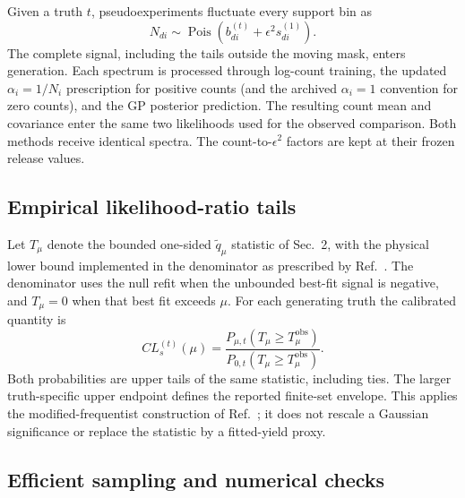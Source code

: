 \documentclass[11pt]{article}
\begin{document}
Given a truth $t$, pseudoexperiments fluctuate every support bin as
\begin{equation}
 N_{di}\sim\operatorname{Pois}\!\left(b^{(t)}_{di}
       +\epsilon^2 s^{(1)}_{di}\right).
\end{equation}
The complete signal, including the tails outside the moving mask, enters
generation. Each spectrum is processed through log-count training, the
updated $\alpha_i=1/N_i$ prescription for positive counts (and the archived
$\alpha_i=1$ convention for zero counts), and the GP posterior prediction.
The resulting count mean and covariance enter the same two likelihoods
used for the observed comparison. Both methods receive identical spectra.
The count-to-$\epsilon^2$ factors are kept at their frozen release values.

\subsection{Empirical likelihood-ratio tails}

Let $T_\mu$ denote the bounded one-sided $\widetilde q_\mu$ statistic of
Sec.~2, with the physical lower bound implemented in the denominator as prescribed
by Ref.~\cite{cowan}. The denominator uses the null refit when the unbounded
best-fit signal is negative, and $T_\mu=0$ when that best fit exceeds $\mu$. For each generating truth the calibrated quantity is
\begin{equation}
 CL_s^{(t)}(\mu)=
 \frac{P_{\mu,t}(T_\mu\ge T_\mu^{\mathrm{obs}})}
      {P_{0,t}(T_\mu\ge T_\mu^{\mathrm{obs}})}.
\end{equation}
Both probabilities are upper tails of the same statistic, including ties.
The larger truth-specific upper endpoint defines the reported finite-set
envelope. This applies the modified-frequentist construction of
Ref.~\cite{readcls}; it does not rescale a Gaussian significance or replace
the statistic by a fitted-yield proxy.

\clearpage
\subsection{Efficient sampling and numerical checks}
\end{document}
